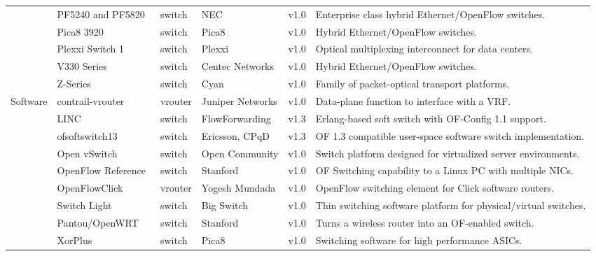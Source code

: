 {\begin{table}[!htp]
\begin{center}
\begin{tabularx}{\linewidth}{p{1.2cm}p{3.1cm}p{0.9cm}p{2.4cm}p{0.8cm}X}
& PF5240 and PF5820~\cite{nec2013-2} & switch & NEC & v1.0 & Enterprise class hybrid Ethernet/OpenFlow switches. \\\cline{2-6}
& Pica8 3920~\cite{pica8opennetworking2013} & switch & Pica8 & v1.0 & Hybrid Ethernet/OpenFlow switches. \\\cline{2-6}
& Plexxi Switch 1~\cite{plexxi2013} & switch & Plexxi & v1.0 & Optical multiplexing interconnect for data centers. \\\cline{2-6}
& V330 Series~\cite{centecnetworks2013} & switch & Centec Networks & v1.0 & Hybrid Ethernet/OpenFlow switches. \\\cline{2-6}
& Z-Series~\cite{cyan2013} & switch & Cyan & v1.0 & Family of packet-optical transport platforms.\\
\hline
\multirow{9}{*}{Software} 
& contrail-vrouter~\cite{networks2013} & vrouter &  Juniper Networks & v1.0 & Data-plane function to interface with a VRF.\\\cline{2-6}
& LINC~\cite{flowforwarding2013,rutka2013} & switch &  FlowForwarding & v1.3 & Erlang-based soft switch with OF-Config 1.1 support.\\\cline{2-6}
& ofsoftswitch13~\cite{cpqd2013} & switch & Ericsson, CPqD & v1.3 & OF 1.3 compatible user-space software switch implementation. \\\cline{2-6}
& Open vSwitch~\cite{listofcontributors2013,pfaff2009} & switch & Open Community & v1.0  & Switch platform designed for virtualized server environments.  \\\cline{2-6}
& OpenFlow Reference~\cite{openflowcommunity2009} & switch & Stanford & v1.0 & OF Switching capability to a Linux PC with multiple NICs. \\\cline{2-6}
& OpenFlowClick~\cite{mundada2009} & vrouter & Yogesh Mundada & v1.0 & OpenFlow switching element for Click software routers.\\\cline{2-6}
& Switch Light~\cite{bigswitchnetworks2013} & switch & Big Switch & v1.0  & Thin switching software platform for physical/virtual switches. \\\cline{2-6}
& Pantou/OpenWRT~\cite{yiakoumis2011} & switch & Stanford  & v1.0 & Turns a wireless router into an OF-enabled switch. \\\cline{2-6}
& XorPlus~\cite{shang2014} & switch &  Pica8 & v1.0 & Switching software for high performance ASICs.\\
\hline
\end{tabularx}
\end{center}
\end{table}
}

